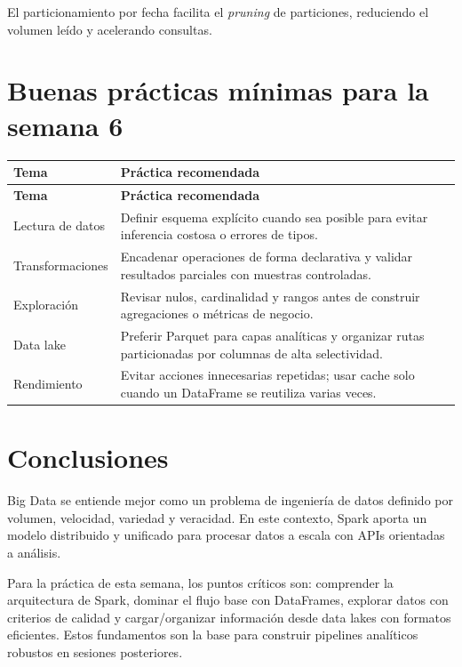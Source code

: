 \documentclass[12pt]{article}
\begin{document}
El particionamiento por fecha facilita el \textit{pruning} de particiones, reduciendo el volumen leído y acelerando consultas.

\section{Buenas prácticas mínimas para la semana 6}
\begin{longtable}{@{}p{}p{}@{}}
\toprule
\textbf{Tema} & \textbf{Práctica recomendada} \\
\midrule
\endfirsthead
\toprule
\textbf{Tema} & \textbf{Práctica recomendada} \\
\midrule
\endhead

Lectura de datos & Definir esquema explícito cuando sea posible para evitar inferencia costosa o errores de tipos. \\

Transformaciones & Encadenar operaciones de forma declarativa y validar resultados parciales con muestras controladas. \\

Exploración & Revisar nulos, cardinalidad y rangos antes de construir agregaciones o métricas de negocio. \\

Data lake & Preferir Parquet para capas analíticas y organizar rutas particionadas por columnas de alta selectividad. \\

Rendimiento & Evitar acciones innecesarias repetidas; usar cache solo cuando un DataFrame se reutiliza varias veces. \\

\bottomrule
\end{longtable}

\section{Conclusiones}
Big Data se entiende mejor como un problema de ingeniería de datos definido por volumen, velocidad, variedad y veracidad. En este contexto, Spark aporta un modelo distribuido y unificado para procesar datos a escala con APIs orientadas a análisis.

Para la práctica de esta semana, los puntos críticos son: comprender la arquitectura de Spark, dominar el flujo base con DataFrames, explorar datos con criterios de calidad y cargar/organizar información desde data lakes con formatos eficientes. Estos fundamentos son la base para construir pipelines analíticos robustos en sesiones posteriores.

\newpage
\printbibliography
\end{document}
